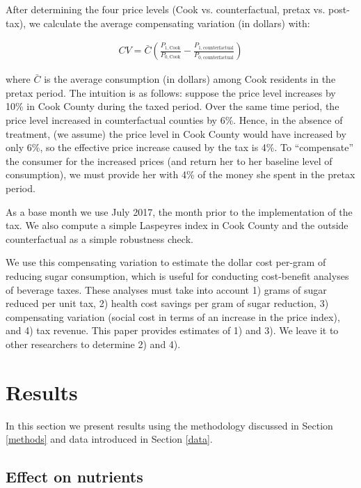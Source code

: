 \documentclass[12pt]{article}
\begin{document}
After determining the four price levels (Cook vs. counterfactual, pretax vs. post-tax), we calculate the average compensating variation (in dollars) with:

\begin{align}
CV = \bar{C}\left(\frac{P_{1,\text{Cook}}}{P_{0,\text{Cook}}} - \frac{P_{1,\text{counterfactual}}}{P_{0,\text{counterfactual}}}\right) \label{cv}
\end{align}

where $\bar{C}$ is the average consumption (in dollars) among Cook residents in the pretax period. The intuition is as follows: suppose the price level increases by 10\% in Cook County during the taxed period. Over the same time period, the price level increased in counterfactual counties by 6\%. Hence, in the absence of treatment, (we assume) the price level in Cook County would have increased by only 6\%, so the effective price increase caused by the tax is 4\%. To ``compensate'' the consumer for the increased prices (and return her to her baseline level of consumption), we must provide her with 4\% of the money she spent in the pretax period.

As a base month we use July 2017, the month prior to the implementation of the tax. We also compute a simple Laspeyres index in Cook County and the outside counterfactual as a simple robustness check.

We use this compensating variation to estimate the dollar cost per-gram of reducing sugar consumption, which is useful for conducting cost-benefit analyses of beverage taxes. These analyses must take into account 1) grams of sugar reduced per unit tax, 2) health cost savings per gram of sugar reduction, 3) compensating variation (social cost in terms of an increase in the price index), and 4) tax revenue. This paper provides estimates of 1) and 3). We leave it to other researchers to determine 2) and 4).


\section{Results} \label{results}
In this section we present results using the methodology discussed in Section \ref{methods} and data introduced in Section \ref{data}.

\subsection{Effect on nutrients}
\end{document}
